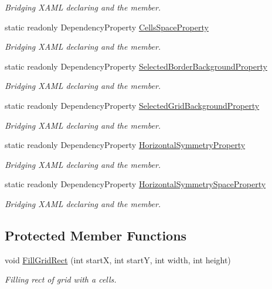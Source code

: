 \begin{DoxyCompactItemize}
\begin{DoxyCompactList}\small\item\em Bridging X\+A\+ML declaring and the member. \end{DoxyCompactList}\item 
static readonly Dependency\+Property \mbox{\hyperlink{class_wpf_handler_1_1_u_i_1_1_controls_1_1_selectable_grid_a3b29cec2069df36506601778308e0c12}{Cells\+Space\+Property}}
\begin{DoxyCompactList}\small\item\em Bridging X\+A\+ML declaring and the member. \end{DoxyCompactList}\item 
static readonly Dependency\+Property \mbox{\hyperlink{class_wpf_handler_1_1_u_i_1_1_controls_1_1_selectable_grid_af245a91354364683ece9619ecb4ce8a4}{Selected\+Border\+Background\+Property}}
\begin{DoxyCompactList}\small\item\em Bridging X\+A\+ML declaring and the member. \end{DoxyCompactList}\item 
static readonly Dependency\+Property \mbox{\hyperlink{class_wpf_handler_1_1_u_i_1_1_controls_1_1_selectable_grid_abc4ecb5aed8ec5cacf5e539bacb89560}{Selected\+Grid\+Background\+Property}}
\begin{DoxyCompactList}\small\item\em Bridging X\+A\+ML declaring and the member. \end{DoxyCompactList}\item 
static readonly Dependency\+Property \mbox{\hyperlink{class_wpf_handler_1_1_u_i_1_1_controls_1_1_selectable_grid_afe30f255ae21ee7c865cab4417b428c2}{Horizontal\+Symmetry\+Property}}
\begin{DoxyCompactList}\small\item\em Bridging X\+A\+ML declaring and the member. \end{DoxyCompactList}\item 
static readonly Dependency\+Property \mbox{\hyperlink{class_wpf_handler_1_1_u_i_1_1_controls_1_1_selectable_grid_a75dc797a169d6fb291e49c970e7e3595}{Horizontal\+Symmetry\+Space\+Property}}
\begin{DoxyCompactList}\small\item\em Bridging X\+A\+ML declaring and the member. \end{DoxyCompactList}\end{DoxyCompactItemize}
\subsection*{Protected Member Functions}
\begin{DoxyCompactItemize}
\item 
void \mbox{\hyperlink{class_wpf_handler_1_1_u_i_1_1_controls_1_1_selectable_grid_a9cda9d0ebfa85f35374d7f7fda7b8a82}{Fill\+Grid\+Rect}} (int startX, int startY, int width, int height)
\begin{DoxyCompactList}\small\item\em Filling rect of grid with a cells. \end{DoxyCompactList}\end{DoxyCompactItemize}
